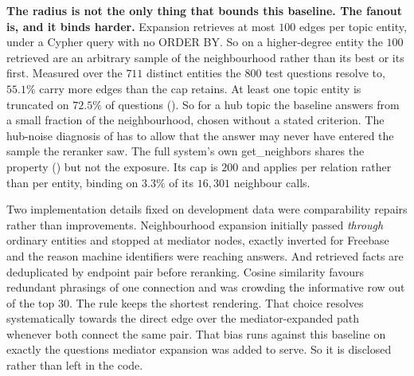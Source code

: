 \textbf{The radius is not the only thing that bounds this baseline. The fanout
is, and it binds harder.} Expansion retrieves at most $100$ edges per topic
entity, under a Cypher query with no \textsf{ORDER BY}. So on a higher-degree
entity the $100$ retrieved are an arbitrary sample of the neighbourhood rather
than its best or its first. Measured over the $711$ distinct entities the $800$
test questions resolve to, $55.1\%$ carry more edges than the cap retains. At
least one topic entity is truncated on $72.5\%$ of questions
(). So for a hub topic the baseline answers from a small
fraction of the neighbourhood, chosen without a stated criterion. The hub-noise
diagnosis of  has to allow that the answer may never have
entered the sample the reranker saw. The full system's own
\textsf{get\_neighbors} shares the property () but not
the exposure. Its cap is $200$ and applies per relation rather than per entity,
binding on $3.3\%$ of its $16{,}301$ neighbour calls.

Two implementation details fixed on development data were comparability repairs
rather than improvements. Neighbourhood expansion initially passed
\emph{through} ordinary entities and stopped at mediator nodes, exactly inverted
for Freebase and the reason machine identifiers were reaching answers. And
retrieved facts are deduplicated by endpoint pair before reranking. Cosine
similarity favours redundant phrasings of one connection and was crowding the
informative row out of the top $30$. The rule keeps the shortest rendering. That
choice resolves systematically towards the direct edge over the
mediator-expanded path whenever both connect the same pair. That bias runs
against this baseline on exactly the questions mediator expansion was added to
serve. So it is disclosed rather than left in the code.

